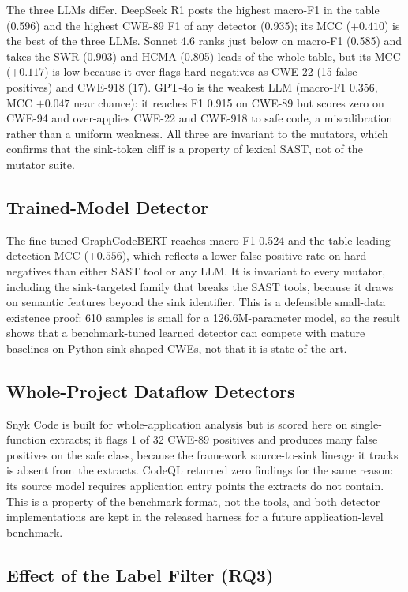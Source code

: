 The three LLMs differ. DeepSeek R1 posts the highest macro-F1 in the
table (0.596) and the highest CWE-89 F1 of any detector (0.935); its MCC
($+0.410$) is the best of the three LLMs. Sonnet 4.6 ranks just below on macro-F1
(0.585) and takes the SWR (0.903) and HCMA (0.805) leads of the whole table, but
its MCC ($+0.117$) is low because it over-flags hard negatives as CWE-22 (15
false positives) and CWE-918 (17). GPT-4o is the weakest LLM (macro-F1 0.356,
MCC $+0.047$ near chance): it reaches F1 0.915 on CWE-89 but scores zero on
CWE-94 and over-applies CWE-22 and CWE-918 to safe code, a miscalibration rather
than a uniform weakness. All three are invariant to the mutators, which confirms
that the sink-token cliff is a property of lexical SAST, not of the mutator
suite.

\subsection{Trained-Model Detector}

The fine-tuned GraphCodeBERT reaches macro-F1 0.524 and the table-leading
detection MCC ($+0.556$), which reflects a lower false-positive rate on hard
negatives than either SAST tool or any LLM. It is invariant to every mutator,
including the sink-targeted family that breaks the SAST tools, because it draws
on semantic features beyond the sink identifier. This is a defensible small-data
existence proof: 610 samples is small for a 126.6M-parameter model, so the
result shows that a benchmark-tuned learned detector can compete with mature
baselines on Python sink-shaped CWEs, not that it is state of the art.

\subsection{Whole-Project Dataflow Detectors}

Snyk Code is built for whole-application analysis but is scored here on
single-function extracts; it flags 1 of 32 CWE-89 positives and produces many
false positives on the safe class, because the framework source-to-sink lineage
it tracks is absent from the extracts. CodeQL returned zero findings for the same
reason: its source model requires application entry points the extracts do not
contain. This is a property of the benchmark format, not the tools, and both
detector implementations are kept in the released harness for a future
application-level benchmark.

\subsection{Effect of the Label Filter (RQ3)}

